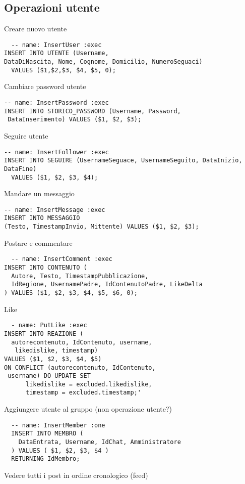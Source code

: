 \documentclass[a4paper,12pt]{report}
\begin{document}
\subsection{Operazioni utente}
Creare nuovo utente
\begin{lstlisting}
  -- name: InsertUser :exec
INSERT INTO UTENTE (Username, 
DataDiNascita, Nome, Cognome, Domicilio, NumeroSeguaci) 
  VALUES ($1,$2,$3, $4, $5, 0);

\end{lstlisting}

Cambiare password utente
\begin{lstlisting}
-- name: InsertPassword :exec
INSERT INTO STORICO_PASSWORD (Username, Password,
 DataInserimento) VALUES ($1, $2, $3);
\end{lstlisting}

Seguire utente
\begin{lstlisting}
-- name: InsertFollower :exec
INSERT INTO SEGUIRE (UsernameSeguace, UsernameSeguito, DataInizio, DataFine)
  VALUES ($1, $2, $3, $4);
\end{lstlisting}

Mandare un messaggio
\begin{lstlisting}
-- name: InsertMessage :exec
INSERT INTO MESSAGGIO 
(Testo, TimestampInvio, Mittente) VALUES ($1, $2, $3);
\end{lstlisting}

Postare e commentare
\begin{lstlisting}
  -- name: InsertComment :exec
INSERT INTO CONTENUTO (
  Autore, Testo, TimestampPubblicazione, 
  IdRegione, UsernamePadre, IdContenutoPadre, LikeDelta
) VALUES ($1, $2, $3, $4, $5, $6, 0);
\end{lstlisting}

Like 
\begin{lstlisting}
  - name: PutLike :exec
INSERT INTO REAZIONE ( 
  autorecontenuto, IdContenuto, username,
   likedislike, timestamp)
VALUES ($1, $2, $3, $4, $5)
ON CONFLICT (autorecontenuto, IdContenuto,
 username) DO UPDATE SET 
      likedislike = excluded.likedislike,
      timestamp = excluded.timestamp;'
\end{lstlisting}

Aggiungere utente al gruppo  (non operazione utente?)
\begin{lstlisting}
  -- name: InsertMember :one
  INSERT INTO MEMBRO (
    DataEntrata, Username, IdChat, Amministratore
  ) VALUES ( $1, $2, $3, $4 )
  RETURNING IdMembro;
\end{lstlisting}
Vedere tutti i post in ordine cronologico (feed)
\end{document}
